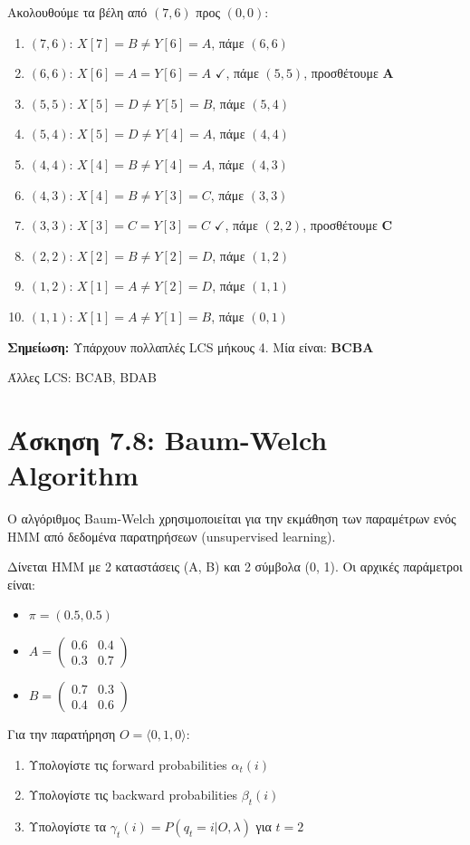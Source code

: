 Ακολουθούμε τα βέλη από $(7,6)$ προς $(0,0)$:
\begin{enumerate}
    \item $(7,6)$: $X[7]=B \neq Y[6]=A$, πάμε $(6,6)$
    \item $(6,6)$: $X[6]=A = Y[6]=A$ $\checkmark$, πάμε $(5,5)$, προσθέτουμε \textbf{A}
    \item $(5,5)$: $X[5]=D \neq Y[5]=B$, πάμε $(5,4)$
    \item $(5,4)$: $X[5]=D \neq Y[4]=A$, πάμε $(4,4)$
    \item $(4,4)$: $X[4]=B \neq Y[4]=A$, πάμε $(4,3)$
    \item $(4,3)$: $X[4]=B \neq Y[3]=C$, πάμε $(3,3)$
    \item $(3,3)$: $X[3]=C = Y[3]=C$ $\checkmark$, πάμε $(2,2)$, προσθέτουμε \textbf{C}
    \item $(2,2)$: $X[2]=B \neq Y[2]=D$, πάμε $(1,2)$
    \item $(1,2)$: $X[1]=A \neq Y[2]=D$, πάμε $(1,1)$
    \item $(1,1)$: $X[1]=A \neq Y[1]=B$, πάμε $(0,1)$
\end{enumerate}

\textbf{Σημείωση:} Υπάρχουν πολλαπλές LCS μήκους 4. Μία είναι: \textbf{BCBA}

Άλλες LCS: BCAB, BDAB

\section{Άσκηση 7.8: Baum-Welch Algorithm}

\begin{formulabox}[Εκφώνηση]
Ο αλγόριθμος Baum-Welch χρησιμοποιείται για την εκμάθηση των παραμέτρων ενός HMM
από δεδομένα παρατηρήσεων (unsupervised learning).

Δίνεται HMM με 2 καταστάσεις (A, B) και 2 σύμβολα (0, 1). Οι αρχικές παράμετροι είναι:
\begin{itemize}
    \item $\pi = (0.5, 0.5)$
    \item $A = \begin{pmatrix} 0.6 & 0.4 \\ 0.3 & 0.7 \end{pmatrix}$
    \item $B = \begin{pmatrix} 0.7 & 0.3 \\ 0.4 & 0.6 \end{pmatrix}$
\end{itemize}

Για την παρατήρηση $O = \langle 0, 1, 0 \rangle$:
\begin{enumerate}
    \item Υπολογίστε τις forward probabilities $\alpha_t(i)$
    \item Υπολογίστε τις backward probabilities $\beta_t(i)$
    \item Υπολογίστε τα $\gamma_t(i) = P(q_t = i | O, \lambda)$ για $t=2$
\end{enumerate}
\end{formulabox}

